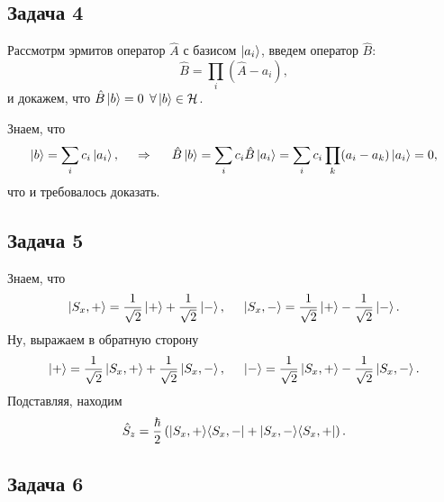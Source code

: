 \subsection*{Задача 4}

Рассмотрм эрмитов оператор $\hat{A}$ с базисом $\left| a_i \right\rangle$, введем оператор $\hat{B}$:
\begin{equation*}
    \hat{B} = \prod_i (\hat{A} - a_i),
\end{equation*}
и докажем, что $\hat{B} \left| b \right\rangle = 0$ $\forall \left| b \right\rangle \in \mathcal H$.

Знаем, что
\begin{equation*}
    \left| b \right\rangle = \sum_i c_i \left| a_i \right\rangle,
    \hspace{0.5cm} \Rightarrow \hspace{0.5cm}
    \hat{B} \left| b \right\rangle = \sum_i c_i \hat{B} \left| a_i \right\rangle = \sum_i c_i \prod_k (a_i - a_k) \left| a_i \right\rangle = 0,
\end{equation*}
что и требовалось доказать.


\subsection*{Задача 5}

Знаем, что
\begin{equation*}
    \left| S_x, + \right\rangle = \frac{1}{\sqrt{2}} \left| + \right\rangle + \frac{1}{\sqrt{2}} \left| - \right\rangle,
    \hspace{5 mm} 
    \left| S_x,- \right\rangle = \frac{1}{\sqrt{2}} \left| + \right\rangle - \frac{1}{\sqrt{2}} \left| - \right\rangle.
\end{equation*}
Ну, выражаем в обратную сторону
\begin{equation*}
    \left| + \right\rangle = \frac{1}{\sqrt{2}} \left| S_x,+ \right\rangle + \frac{1}{\sqrt{2}} \left| S_x,- \right\rangle,
    \hspace{5 mm} 
    \left| - \right\rangle = \frac{1}{\sqrt{2}} \left| S_x,+ \right\rangle - \frac{1}{\sqrt{2}} \left| S_x, - \right\rangle.
\end{equation*}
Подставляя, находим
\begin{equation*}
    \hat{S}_z = \frac{\hbar}{2} \left(
        \kb{S_x,+}{S_x,-} + \kb{S_x,-}{S_x,+}
    \right).
\end{equation*}



\subsection*{Задача 6}


